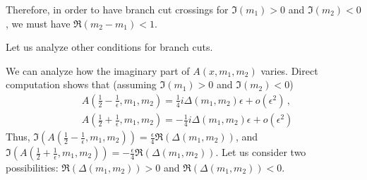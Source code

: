 \documentclass[twoside]{article}
\begin{document}
Therefore, in order to have branch cut crossings for $\Im(m_1)>0$ and $\Im(m_2)<0$, we must have $\Re(m_2 - m_1) < 1$.

Let us analyze other conditions for branch cuts.

We can analyze how the imaginary part of $A(x,m_1,m_2)$ varies.
Direct computation shows that (assuming $\Im(m_1)>0$ and $\Im(m_2)<0$) 
\begin{equation}
\begin{split}
&A\left(\frac{1}{2} - \frac{1}{\epsilon},m_1,m_2\right) = \frac{1}{4} i \Delta(m_1,m_2) \epsilon + o(\epsilon^2) \,, \\
&A\left(\frac{1}{2} + \frac{1}{\epsilon},m_1,m_2\right) = -\frac{1}{4} i \Delta(m_1,m_2) \epsilon + o(\epsilon^2)
\end{split}
\end{equation} 
Thus, $\Im\left(A\left(\frac{1}{2} - \frac{1}{\epsilon},m_1,m_2\right)\right) = \frac{\epsilon}{4} \Re(\Delta(m_1,m_2)) $, and $\Im\left(A\left(\frac{1}{2} + \frac{1}{\epsilon},m_1,m_2\right)\right) = -\frac{\epsilon}{4} \Re(\Delta(m_1,m_2))$.
Let us consider two possibilities: $\Re(\Delta(m_1,m_2)) > 0$ and $\Re(\Delta(m_1,m_2)) < 0$.
\end{document}
